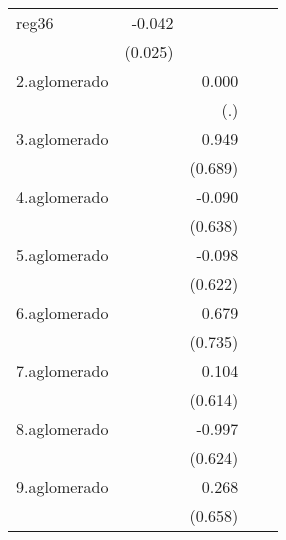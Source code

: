{\begin{longtable}{l*{4}{D{.}{.}{-1}}}
\addlinespace
reg36       &      -0.042         &                     &                     &                     \\
            &     (0.025)         &                     &                     &                     \\
\addlinespace
2.aglomerado&                     &       0.000         &                     &                     \\
            &                     &         (.)         &                     &                     \\
\addlinespace
3.aglomerado&                     &       0.949         &                     &                     \\
            &                     &     (0.689)         &                     &                     \\
\addlinespace
4.aglomerado&                     &      -0.090         &                     &                     \\
            &                     &     (0.638)         &                     &                     \\
\addlinespace
5.aglomerado&                     &      -0.098         &                     &                     \\
            &                     &     (0.622)         &                     &                     \\
\addlinespace
6.aglomerado&                     &       0.679         &                     &                     \\
            &                     &     (0.735)         &                     &                     \\
\addlinespace
7.aglomerado&                     &       0.104         &                     &                     \\
            &                     &     (0.614)         &                     &                     \\
\addlinespace
8.aglomerado&                     &      -0.997         &                     &                     \\
            &                     &     (0.624)         &                     &                     \\
\addlinespace
9.aglomerado&                     &       0.268         &                     &                     \\
            &                     &     (0.658)         &                     &                     \\

\end{longtable}}
